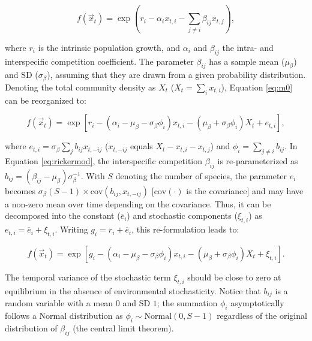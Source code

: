 \documentclass[12pt, class=article, crop=false]{standalone}
\begin{document}
\begin{equation}
\label{eq:ricker}
f(\overset{\rightarrow}{x}_{t}) = \exp(r_i - \alpha_i x_{t,i} - \sum_{j \ne i} \beta_{ij} x_{t,j}),
\end{equation}

where $r_i$ is the intrinsic population growth, and $\alpha_{i}$ and $\beta_{ij}$ the intra- and interspecific competition coefficient.
The parameter $\beta_{ij}$ has a sample mean ($\mu_{\beta}$) and SD ($\sigma_{\beta}$), assuming that they are drawn from a given probability distribution. 
Denoting the total community density as $X_t$ ($X_t = \sum_i x_{t,i}$), Equation \ref{eq:m0} can be reorganized to:

\begin{equation}
\label{eq:rickermod}
f(\overset{\rightarrow}{x}_{t}) = \exp\left[r_i - (\alpha_i - \mu_{\beta} - \sigma_{\beta} \phi_i) x_{t,i} - (\mu_{\beta} +  \sigma_{\beta} \phi_i) X_t + e_{t,i} \right],
\end{equation}

where $e_{t,i} = \sigma_{\beta} \sum_{j} b_{ij} x_{t,-ij}$ ($x_{t,-ij}$ equals $X_t - x_{t,i} - x_{t,j}$) and $\phi_i = \sum_{j \ne i} b_{ij}$.
In Equation \ref{eq:rickermod}, the interspecific competition $\beta_{ij}$ is re-parameterized as $b_{ij} = (\beta_{ij} - \mu_{\beta}) \sigma_{\beta}^{-1}$.
With $S$ denoting the number of species, the parameter $e_i$ becomes $\sigma_{\beta}(S - 1) \times \mbox{cov} (b_{ij}, x_{t,-ij})$ [$\mbox{cov}(\cdot)$ is the covariance] and may have a non-zero mean over time depending on the covariance.
Thus, it can be decomposed into the constant ($\overline{e}_i$) and stochastic components ($\xi_{t,i}$) as $e_{t,i} = \overline{e}_i + \xi_{t,i}$.
Writing $g_{i} = r_i + \overline{e}_i$, this re-formulation leads to:

\begin{equation}
    f(\overset{\rightarrow}{x}_{t}) = \exp\left[g_{i} - (\alpha_i - \mu_{\beta} - \sigma_{\beta} \phi_i) x_{t,i} - (\mu_{\beta} +  \sigma_{\beta} \phi_i) X_t + \xi_{t,i} \right].
\end{equation}

The temporal variance of the stochastic term $\xi_{t,i}$ should be close to zero at equilibrium in the absence of environmental stochasticity.
Notice that $b_{ij}$ is a random variable with a mean $0$ and SD $1$; the summation $\phi_i$ asymptotically follows a Normal distribution as $\phi_i \sim \mbox{Normal}(0, S - 1)$ regardless of the original distribution of $\beta_{ij}$ (the central limit theorem).
\end{document}
